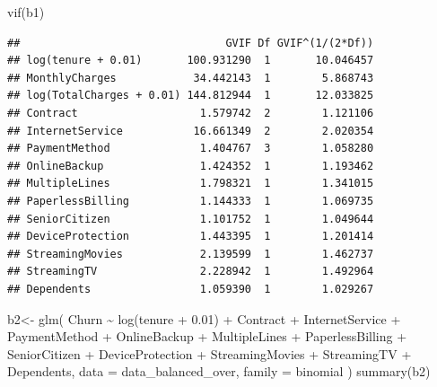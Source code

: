 \documentclass[
  twoside]{article}
\newenvironment{Shaded}{\begin{snugshade}}{\end{snugshade}}
\newcommand{\AttributeTok}[1]{\textcolor[rgb]{0.77,0.63,0.00}{#1}}
\newcommand{\FloatTok}[1]{\textcolor[rgb]{0.00,0.00,0.81}{#1}}
\newcommand{\FunctionTok}[1]{\textcolor[rgb]{0.00,0.00,0.00}{#1}}
\newcommand{\NormalTok}[1]{#1}
\newcommand{\OtherTok}[1]{\textcolor[rgb]{0.56,0.35,0.01}{#1}}
\newcommand{\SpecialCharTok}[1]{\textcolor[rgb]{0.00,0.00,0.00}{#1}}
\begin{document}
\begin{Shaded}
\begin{Highlighting}[]
\FunctionTok{vif}\NormalTok{(b1)}
\end{Highlighting}
\end{Shaded}

\begin{verbatim}
##                                GVIF Df GVIF^(1/(2*Df))
## log(tenure + 0.01)       100.931290  1       10.046457
## MonthlyCharges            34.442143  1        5.868743
## log(TotalCharges + 0.01) 144.812944  1       12.033825
## Contract                   1.579742  2        1.121106
## InternetService           16.661349  2        2.020354
## PaymentMethod              1.404767  3        1.058280
## OnlineBackup               1.424352  1        1.193462
## MultipleLines              1.798321  1        1.341015
## PaperlessBilling           1.144333  1        1.069735
## SeniorCitizen              1.101752  1        1.049644
## DeviceProtection           1.443395  1        1.201414
## StreamingMovies            2.139599  1        1.462737
## StreamingTV                2.228942  1        1.492964
## Dependents                 1.059390  1        1.029267
\end{verbatim}

\begin{Shaded}
\begin{Highlighting}[]
\NormalTok{b2}\OtherTok{\textless{}{-}} \FunctionTok{glm}\NormalTok{(}
\NormalTok{  Churn }\SpecialCharTok{\textasciitilde{}} \FunctionTok{log}\NormalTok{(tenure }\SpecialCharTok{+} \FloatTok{0.01}\NormalTok{)}
  \SpecialCharTok{+}\NormalTok{ Contract  }\SpecialCharTok{+}\NormalTok{ InternetService }\SpecialCharTok{+}\NormalTok{ PaymentMethod }
  \SpecialCharTok{+}\NormalTok{ OnlineBackup }\SpecialCharTok{+}\NormalTok{ MultipleLines }\SpecialCharTok{+}\NormalTok{ PaperlessBilling }\SpecialCharTok{+}\NormalTok{ SeniorCitizen }
   \SpecialCharTok{+}\NormalTok{ DeviceProtection }\SpecialCharTok{+}\NormalTok{ StreamingMovies }\SpecialCharTok{+}\NormalTok{ StreamingTV }
  \SpecialCharTok{+}\NormalTok{ Dependents,}
  \AttributeTok{data =}\NormalTok{ data\_balanced\_over,}
  \AttributeTok{family =}\NormalTok{ binomial}
\NormalTok{)}
\FunctionTok{summary}\NormalTok{(b2)}
\end{Highlighting}
\end{Shaded}
\end{document}
